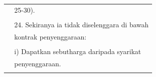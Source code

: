 \documentclass[
]{article}
\begin{document}
\begin{longtable}[]{@{}ll@{}}
\begin{minipage}[t]{0.23\columnwidth}
\strut
\end{minipage} & \begin{minipage}[t]{0.71\columnwidth}\raggedright
25-30).\strut
\end{minipage}\tabularnewline
\begin{minipage}[t]{0.23\columnwidth}\raggedright
\strut
\end{minipage} & \begin{minipage}[t]{0.71\columnwidth}\raggedright
\strut
\end{minipage}\tabularnewline
\begin{minipage}[t]{0.23\columnwidth}\raggedright
\strut
\end{minipage} & \begin{minipage}[t]{0.71\columnwidth}\raggedright
24. Sekiranya ia tidak diselenggara di bawah\strut
\end{minipage}\tabularnewline
\begin{minipage}[t]{0.23\columnwidth}\raggedright
\strut
\end{minipage} & \begin{minipage}[t]{0.71\columnwidth}\raggedright
kontrak penyenggaraan:\strut
\end{minipage}\tabularnewline
\begin{minipage}[t]{0.23\columnwidth}\raggedright
\strut
\end{minipage} & \begin{minipage}[t]{0.71\columnwidth}\raggedright
\strut
\end{minipage}\tabularnewline
\begin{minipage}[t]{0.23\columnwidth}\raggedright
\strut
\end{minipage} & \begin{minipage}[t]{0.71\columnwidth}\raggedright
i) Dapatkan sebutharga daripada syarikat\strut
\end{minipage}\tabularnewline
\begin{minipage}[t]{0.23\columnwidth}\raggedright
\strut
\end{minipage} & \begin{minipage}[t]{0.71\columnwidth}\raggedright
penyenggaraan.\strut
\end{minipage}\tabularnewline
\begin{minipage}[t]{0.23\columnwidth}\raggedright
\strut
\end{minipage} & \begin{minipage}[t]{0.71\columnwidth}\raggedright
\strut
\end{minipage}\tabularnewline

\end{longtable}
\end{document}
